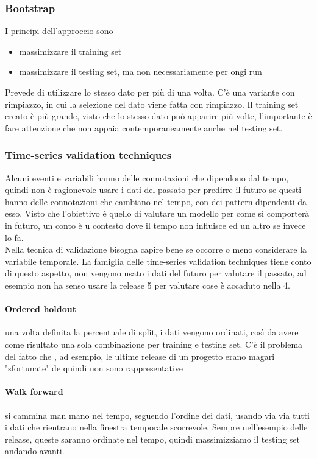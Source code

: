 \documentclass{article}
\begin{document}
\subsubsection{Bootstrap}
I principi dell'approccio sono
\begin{itemize}
\item massimizzare il training set
\item massimizzare il testing set, ma non necessariamente per ongi run
\end{itemize}
Prevede di utilizzare lo stesso dato per più di una volta. C'è una variante con rimpiazzo, in cui la selezione del dato viene fatta con rimpiazzo. Il training set creato è più grande, visto che lo stesso dato può apparire più volte, l'importante è fare attenzione che non appaia contemporaneamente anche nel testing set.
\subsubsection{Time-series validation techniques}
Alcuni eventi e variabili hanno delle connotazioni che dipendono dal tempo, quindi non è ragionevole usare i dati del passato per predirre il futuro se questi hanno delle connotazioni che cambiano nel tempo, con dei pattern dipendenti da esso. Visto che l'obiettivo è quello di valutare un modello per come si comporterà in futuro, un conto è u contesto dove il tempo non influisce ed un altro se invece lo fa.\\ Nella tecnica di validazione bisogna capire bene se occorre o meno considerare la variabile temporale. La famiglia delle time-series validation techniques tiene conto di questo aspetto, non vengono usato i dati del futuro per valutare il passato, ad esempio non ha senso usare la release 5 per valutare cose è accaduto nella 4.
\paragraph{Ordered holdout}una volta definita la percentuale di split, i dati vengono ordinati, così da avere come risultato una sola combinazione per training e testing set. C'è il problema del fatto che , ad esempio, le ultime release di un progetto erano magari "sfortunate" de quindi non sono rappresentative
\paragraph{Walk forward}si cammina man mano nel tempo, seguendo l'ordine dei dati, usando via via tutti i dati che rientrano nella finestra temporale scorrevole. Sempre nell'esempio delle release, queste saranno ordinate nel tempo, quindi massimizziamo il testing set andando avanti.
\end{document}
